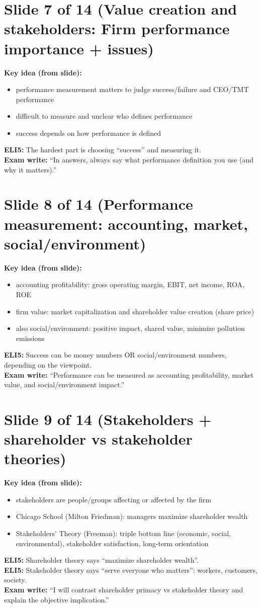 \documentclass[11pt,a4paper]{article}
\begin{document}
\section*{Slide 7 of 14 (Value creation and stakeholders: Firm performance importance + issues)}
\textbf{Key idea (from slide):}
\begin{itemize}
  \item performance measurement matters to judge success/failure and CEO/TMT performance
  \item difficult to measure and unclear who defines performance
  \item success depends on how performance is defined
\end{itemize}
\textbf{ELI5:} The hardest part is choosing ``success'' and measuring it.\\
\textbf{Exam write:} ``In answers, always say what performance definition you use (and why it matters).''

\section*{Slide 8 of 14 (Performance measurement: accounting, market, social/environment)}
\textbf{Key idea (from slide):}
\begin{itemize}
  \item accounting profitability: gross operating margin, EBIT, net income, ROA, ROE
  \item firm value: market capitalization and shareholder value creation (share price)
  \item also social/environment: positive impact, shared value, minimize pollution emissions
\end{itemize}
\textbf{ELI5:} Success can be money numbers OR social/environment numbers, depending on the viewpoint.\\
\textbf{Exam write:} ``Performance can be measured as accounting profitability, market value, and social/environment impact.''

\section*{Slide 9 of 14 (Stakeholders + shareholder vs stakeholder theories)}
\textbf{Key idea (from slide):}
\begin{itemize}
  \item stakeholders are people/groups affecting or affected by the firm
  \item Chicago School (Milton Friedman): managers maximize shareholder wealth
  \item Stakeholders’ Theory (Freeman): triple bottom line (economic, social, environmental), stakeholder satisfaction, long-term orientation
\end{itemize}
\textbf{ELI5:} Shareholder theory says ``maximize shareholder wealth''.\\
\textbf{ELI5:} Stakeholder theory says ``serve everyone who matters'': workers, customers, society.\\
\textbf{Exam write:} ``I will contrast shareholder primacy vs stakeholder theory and explain the objective implication.''
\end{document}
